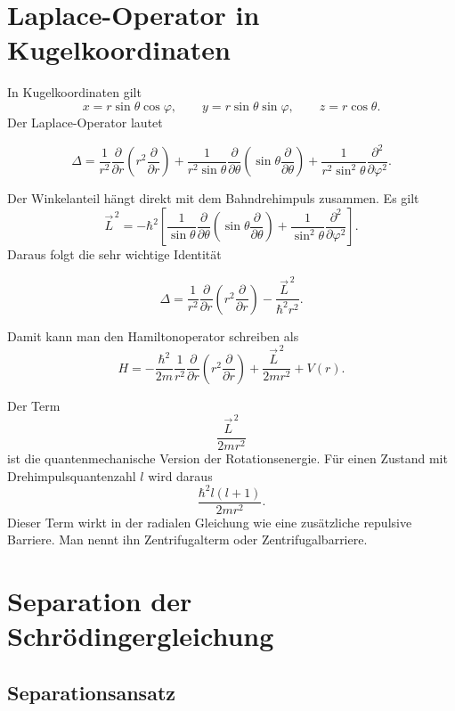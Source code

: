 \section{Laplace-Operator in Kugelkoordinaten}

In Kugelkoordinaten gilt
\[
    x=r\sin\theta\cos\varphi,
    \qquad
    y=r\sin\theta\sin\varphi,
    \qquad
    z=r\cos\theta.
\]
Der Laplace-Operator lautet
\begin{formulabox}
\[
    \Delta
    =\frac{1}{r^2}\frac{\partial}{\partial r}
        \left(r^2\frac{\partial}{\partial r}\right)
    +\frac{1}{r^2\sin\theta}\frac{\partial}{\partial\theta}
        \left(\sin\theta\frac{\partial}{\partial\theta}\right)
    +\frac{1}{r^2\sin^2\theta}\frac{\partial^2}{\partial\varphi^2}.
\]
\end{formulabox}

Der Winkelanteil hängt direkt mit dem Bahndrehimpuls zusammen. Es gilt
\[
    \vec L^{\,2}
    =-\hbar^2\left[\frac{1}{\sin\theta}\frac{\partial}{\partial\theta}
        \left(\sin\theta\frac{\partial}{\partial\theta}\right)
    +\frac{1}{\sin^2\theta}\frac{\partial^2}{\partial\varphi^2}\right].
\]
Daraus folgt die sehr wichtige Identität
\begin{formulabox}
\[
    \Delta
    =\frac{1}{r^2}\frac{\partial}{\partial r}
        \left(r^2\frac{\partial}{\partial r}\right)
    -\frac{\vec L^{\,2}}{\hbar^2r^2}.
\]
\end{formulabox}

Damit kann man den Hamiltonoperator schreiben als
\[
    H
    =-\frac{\hbar^2}{2m}\frac{1}{r^2}\frac{\partial}{\partial r}
        \left(r^2\frac{\partial}{\partial r}\right)
    +\frac{\vec L^{\,2}}{2mr^2}+V(r).
\]

\begin{conceptbox}
Der Term
\[
    \frac{\vec L^{\,2}}{2mr^2}
\]
ist die quantenmechanische Version der Rotationsenergie. Für einen Zustand mit Drehimpulsquantenzahl \(l\) wird daraus
\[
    \frac{\hbar^2l(l+1)}{2mr^2}.
\]
Dieser Term wirkt in der radialen Gleichung wie eine zusätzliche repulsive Barriere. Man nennt ihn Zentrifugalterm oder Zentrifugalbarriere.
\end{conceptbox}

\section{Separation der Schrödingergleichung}

\subsection{Separationsansatz}

